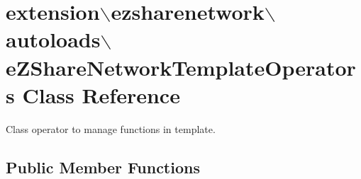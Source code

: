 \hypertarget{classextension_1_1ezsharenetwork_1_1autoloads_1_1e_z_share_network_template_operators}{\section{extension$\backslash$ezsharenetwork$\backslash$autoloads$\backslash$e\-Z\-Share\-Network\-Template\-Operators Class Reference}
\label{classextension_1_1ezsharenetwork_1_1autoloads_1_1e_z_share_network_template_operators}
}


Class operator to manage functions in template.  


\subsection*{Public Member Functions}
